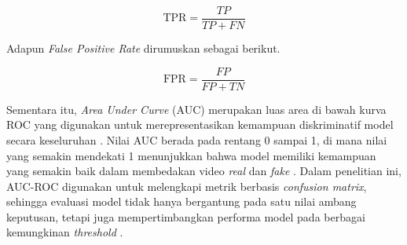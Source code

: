 \vspace{0.5\baselineskip}
\begin{equation}
\mathrm{TPR} = \frac{TP}{TP + FN}
\label{eq:tpr}
\end{equation}
\vspace{0.5\baselineskip}

Adapun \textit{False Positive Rate} dirumuskan sebagai berikut.

\vspace{0.5\baselineskip}
\begin{equation}
\mathrm{FPR} = \frac{FP}{FP + TN}
\label{eq:fpr}
\end{equation}
\vspace{0.5\baselineskip}

Sementara itu, \textit{Area Under Curve} (AUC) merupakan luas area di bawah kurva ROC yang digunakan untuk merepresentasikan kemampuan diskriminatif model secara keseluruhan \cite{FAWCETT2006861}. Nilai AUC berada pada rentang 0 sampai 1, di mana nilai yang semakin mendekati 1 menunjukkan bahwa model memiliki kemampuan yang semakin baik dalam membedakan video \textit{real} dan \textit{fake} \cite{FAWCETT2006861}. Dalam penelitian ini, AUC-ROC digunakan untuk melengkapi metrik berbasis \textit{confusion matrix}, sehingga evaluasi model tidak hanya bergantung pada satu nilai ambang keputusan, tetapi juga mempertimbangkan performa model pada berbagai kemungkinan \textit{threshold} \cite{FAWCETT2006861,powers2020evaluationprecisionrecallfmeasure}. \par
